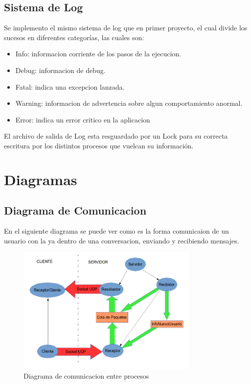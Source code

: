 \documentclass[a4paper,12pt,titlepage]{article}
\begin{document}
\subsection{Sistema de Log}

Se implemento el mismo sistema de log que en primer proyecto, el cual divide los sucesos en diferentes categorías, las cuales son:
\begin{itemize}
\item Info: informacion corriente de los pasos de la ejecucion.
\item Debug: informacion de debug.
\item Fatal: indica una excepcion lanzada.
\item Warning: informacion de advertencia sobre algun comportamiento anormal.
\item Error: indica un error critico en la aplicacion
\end{itemize}
El archivo de salida de Log esta resguardado por un Lock para su correcta escritura por los distintos procesos que vuelcan su información.

\newpage
\section{Diagramas}
\subsection{Diagrama de Comunicacion}
En el siguiente diagrama se puede ver como es la forma comunicaion de un usuario con la ya dentro de una conversacion, enviando y recibiendo mensajes.
\begin{figure}[h!]
\centering
\includegraphics[width=0.8\textwidth]{dia_comunicacion.png}
\caption{Diagrama de comunicacion entre procesos}
\label{fig:comunicacion}
\end{figure}
\end{document}
